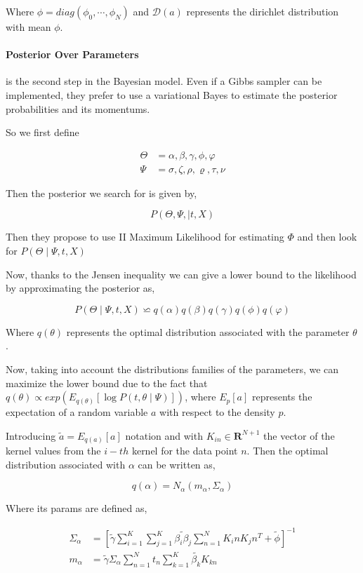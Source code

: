\documentclass[11pt,a4paper]{article}
\begin{document}
Where $\phi = diag(\phi_0, \cdots, \phi_N)$ and $\mathcal{D}(a)$ represents the dirichlet distribution with mean $\phi$. 

\paragraph{Posterior Over Parameters} is the second step in the Bayesian model. Even if a Gibbs sampler can be implemented, they prefer to use a variational Bayes to estimate the posterior probabilities and its momentums. 

So we first define

\begin{align*}
    \Theta &= {\alpha, \beta, \gamma, \phi, \varphi} \\
    \Psi &= {\sigma, \zeta, \rho, \varrho, \tau, \nu}
\end{align*}

Then the posterior we search for is given by,

$$
P(\Theta, \Psi, \mid t, X)
$$

Then they propose to use II Maximum Likelihood for estimating $\Phi$ and then look for $P(\Theta \mid \Psi, t, X)$

Now, thanks to the Jensen inequality we can give a lower bound to the likelihood by approximating the posterior as,

$$
P(\Theta \mid \Psi, t, X) \backsimeq q(\alpha)q(\beta)q(\gamma)q(\phi)q(\varphi)
$$

Where $q(\theta)$ represents the optimal distribution associated with the parameter $\theta$. 

Now, taking into account the distributions families of the parameters, we can maximize the lower bound due to the fact that $q(\theta) \propto exp(E_{q(\theta)}[\log P(t, \theta \mid \Psi)])$, where $E_p[a]$ represents the expectation of a random variable $a$ with respect to the density $p$. 

Introducing $\widetilde{a} = E_{q(a)} [a]$ notation and with $K_{in} \in \mathbf{R}^{N+1}$ the vector of the kernel values from the $i-th$ kernel for the data point $n$. Then the optimal distribution associated with $\alpha$ can be written as,

$$
q(\alpha) = N_{\alpha}(m_{\alpha}, \Sigma_{\alpha})
$$

Where its params are defined as,

\begin{align*}
    \Sigma_{\alpha} &= \left[ \widetilde{\gamma} \sum^K_{i=1} \sum^K_{j=1} \widetilde{\beta_i \beta_j} \sum^N_{n=1} K_in K_jn^T + \widetilde{\phi} \right]^{-1} \\
    m_{\alpha} &= \widetilde{\gamma} \Sigma_{\alpha} \sum^N_{n=1} t_n \sum^K_{k=1} \widetilde{\beta_k}K_{kn}
\end{align*}
\end{document}
